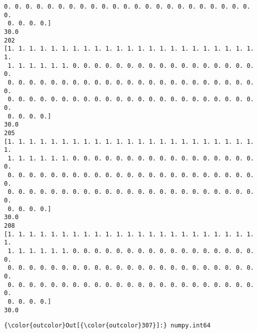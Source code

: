 \documentclass[11pt]{article}
\begin{document}
\begin{Verbatim}[commandchars=\\\{\}]
 0. 0. 0. 0. 0. 0. 0. 0. 0. 0. 0. 0. 0. 0. 0. 0. 0. 0. 0. 0. 0. 0. 0. 0.
 0. 0. 0. 0.]
30.0
202
[1. 1. 1. 1. 1. 1. 1. 1. 1. 1. 1. 1. 1. 1. 1. 1. 1. 1. 1. 1. 1. 1. 1. 1.
 1. 1. 1. 1. 1. 1. 0. 0. 0. 0. 0. 0. 0. 0. 0. 0. 0. 0. 0. 0. 0. 0. 0. 0.
 0. 0. 0. 0. 0. 0. 0. 0. 0. 0. 0. 0. 0. 0. 0. 0. 0. 0. 0. 0. 0. 0. 0. 0.
 0. 0. 0. 0. 0. 0. 0. 0. 0. 0. 0. 0. 0. 0. 0. 0. 0. 0. 0. 0. 0. 0. 0. 0.
 0. 0. 0. 0.]
30.0
205
[1. 1. 1. 1. 1. 1. 1. 1. 1. 1. 1. 1. 1. 1. 1. 1. 1. 1. 1. 1. 1. 1. 1. 1.
 1. 1. 1. 1. 1. 1. 0. 0. 0. 0. 0. 0. 0. 0. 0. 0. 0. 0. 0. 0. 0. 0. 0. 0.
 0. 0. 0. 0. 0. 0. 0. 0. 0. 0. 0. 0. 0. 0. 0. 0. 0. 0. 0. 0. 0. 0. 0. 0.
 0. 0. 0. 0. 0. 0. 0. 0. 0. 0. 0. 0. 0. 0. 0. 0. 0. 0. 0. 0. 0. 0. 0. 0.
 0. 0. 0. 0.]
30.0
208
[1. 1. 1. 1. 1. 1. 1. 1. 1. 1. 1. 1. 1. 1. 1. 1. 1. 1. 1. 1. 1. 1. 1. 1.
 1. 1. 1. 1. 1. 1. 0. 0. 0. 0. 0. 0. 0. 0. 0. 0. 0. 0. 0. 0. 0. 0. 0. 0.
 0. 0. 0. 0. 0. 0. 0. 0. 0. 0. 0. 0. 0. 0. 0. 0. 0. 0. 0. 0. 0. 0. 0. 0.
 0. 0. 0. 0. 0. 0. 0. 0. 0. 0. 0. 0. 0. 0. 0. 0. 0. 0. 0. 0. 0. 0. 0. 0.
 0. 0. 0. 0.]
30.0

    \end{Verbatim}

\begin{Verbatim}[commandchars=\\\{\}]
{\color{outcolor}Out[{\color{outcolor}307}]:} numpy.int64
\end{Verbatim}
            
\end{document}

